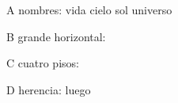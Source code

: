 \documentclass{article}
\begin{document}
A nombres: \textcolor{mayaVida}{vida} \textcolor{mayaCielo}{cielo}
           \textcolor{mayaSol}{sol} \textcolor{mayaUniverso}{universo}\par
B grande horizontal: \par
C cuatro pisos: \par
D herencia:  luego 
\end{document}
